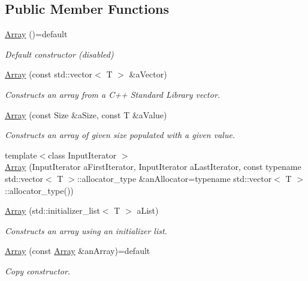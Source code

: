 \subsection*{Public Member Functions}
\begin{DoxyCompactItemize}
\item 
\hyperlink{classlibrary_1_1core_1_1ctnr_1_1_array_a8aa661d7a5bbcce25394d1778dbe3a18}{Array} ()=default
\begin{DoxyCompactList}\small\item\em Default constructor (disabled) \end{DoxyCompactList}\item 
\hyperlink{classlibrary_1_1core_1_1ctnr_1_1_array_a9b510b4e2a3f9d4a324dfd0feba01285}{Array} (const std\+::vector$<$ T $>$ \&a\+Vector)
\begin{DoxyCompactList}\small\item\em Constructs an array from a C++ Standard Library vector. \end{DoxyCompactList}\item 
\hyperlink{classlibrary_1_1core_1_1ctnr_1_1_array_a647190cec3e259a8d8ad173c18bf3020}{Array} (const Size \&a\+Size, const T \&a\+Value)
\begin{DoxyCompactList}\small\item\em Constructs an array of given size populated with a given value. \end{DoxyCompactList}\item 
{\footnotesize template$<$class Input\+Iterator $>$ }\\\hyperlink{classlibrary_1_1core_1_1ctnr_1_1_array_ad4fa22d8de4f796b8baf34d7e0aa89ba}{Array} (Input\+Iterator a\+First\+Iterator, Input\+Iterator a\+Last\+Iterator, const typename std\+::vector$<$ T $>$\+::allocator\+\_\+type \&an\+Allocator=typename std\+::vector$<$ T $>$\+::allocator\+\_\+type())
\item 
\hyperlink{classlibrary_1_1core_1_1ctnr_1_1_array_adcda1d4d28575b580a978406107febbb}{Array} (std\+::initializer\+\_\+list$<$ T $>$ a\+List)
\begin{DoxyCompactList}\small\item\em Constructs an array using an initializer list. \end{DoxyCompactList}\item 
\hyperlink{classlibrary_1_1core_1_1ctnr_1_1_array_a1f218e9e89d4c2cfa84ed8c070894a9d}{Array} (const \hyperlink{classlibrary_1_1core_1_1ctnr_1_1_array}{Array} \&an\+Array)=default
\begin{DoxyCompactList}\small\item\em Copy constructor. \end{DoxyCompactList}\item 

\end{DoxyCompactItemize}
